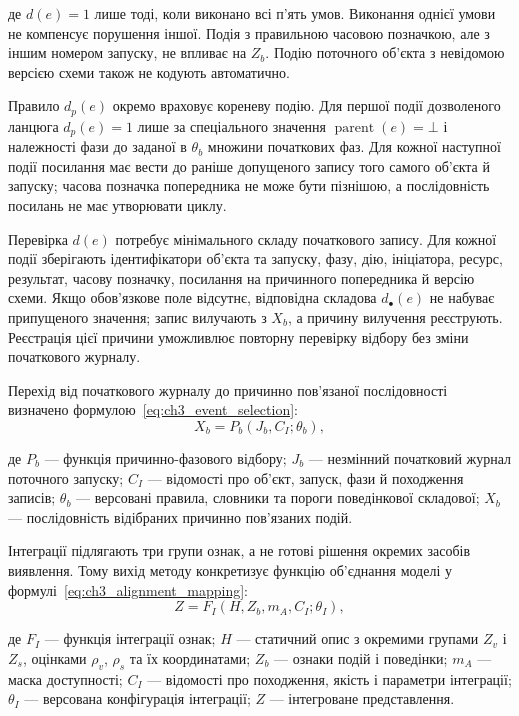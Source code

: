 де $d(e)=1$ лише тоді, коли виконано всі п’ять умов. Виконання однієї умови не компенсує порушення іншої. Подія з правильною часовою позначкою, але з іншим номером запуску, не впливає на $Z_b$. Подію поточного об’єкта з невідомою версією схеми також не кодують автоматично.

Правило $d_p(e)$ окремо враховує кореневу подію. Для першої події дозволеного ланцюга $d_p(e)=1$ лише за спеціального значення $\operatorname{parent}(e)=\bot$ і належності фази до заданої в $\theta_b$ множини початкових фаз. Для кожної наступної події посилання має вести до раніше допущеного запису того самого об’єкта й запуску; часова позначка попередника не може бути пізнішою, а послідовність посилань не має утворювати циклу.

Перевірка $d(e)$ потребує мінімального складу початкового запису. Для кожної події зберігають ідентифікатори об’єкта та запуску, фазу, дію, ініціатора, ресурс, результат, часову позначку, посилання на причинного попередника й версію схеми. Якщо обов’язкове поле відсутнє, відповідна складова $d_{\bullet}(e)$ не набуває припущеного значення; запис вилучають з $X_b$, а причину вилучення реєструють. Реєстрація цієї причини уможливлює повторну перевірку відбору без зміни початкового журналу.

Перехід від початкового журналу до причинно пов’язаної послідовності визначено формулою~\eqref{eq:ch3_event_selection}:
\begin{equation}
X_b=P_b(J_b,C_I;\theta_b),
\label{eq:ch3_event_selection}
\end{equation}

де $P_b$ --- функція причинно-фазового відбору; $J_b$ --- незмінний початковий журнал поточного запуску; $C_I$ --- відомості про об’єкт, запуск, фази й походження записів; $\theta_b$ --- версовані правила, словники та пороги поведінкової складової; $X_b$ --- послідовність відібраних причинно пов’язаних подій.

Інтеграції підлягають три групи ознак, а не готові рішення окремих засобів виявлення. Тому вихід методу конкретизує функцію об’єднання моделі у формулі~\eqref{eq:ch3_alignment_mapping}:
\begin{equation}
Z=F_I(H,Z_b,m_A,C_I;\theta_I),
\label{eq:ch3_alignment_mapping}
\end{equation}

де $F_I$ --- функція інтеграції ознак; $H$ --- статичний опис з окремими групами $Z_v$ і $Z_s$, оцінками $\rho_v$, $\rho_s$ та їх координатами; $Z_b$ --- ознаки подій і поведінки; $m_A$ --- маска доступності; $C_I$ --- відомості про походження, якість і параметри інтеграції; $\theta_I$ --- версована конфігурація інтеграції; $Z$ --- інтегроване представлення.

